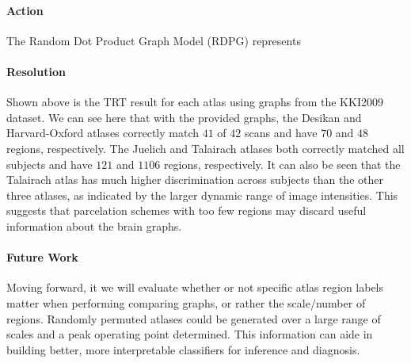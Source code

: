 \documentclass[12pt]{article}
\begin{document}
\paragraph{Action}
The Random Dot Product Graph Model (RDPG) represents
\paragraph{Resolution}
Shown above is the TRT result for each atlas using graphs from the KKI2009 dataset. We can see here that with the provided graphs, the Desikan and Harvard-Oxford atlases correctly match $41$ of $42$ scans and have $70$ and $48$ regions, respectively. The Juelich and Talairach atlases both correctly matched all subjects and have $121$ and $1106$ regions, respectively. It can also be seen that the Talairach atlas has much higher discrimination across subjects than the other three atlases, as indicated by the larger dynamic range of image intensities. This suggests that parcelation schemes with too few regions may discard useful information about the brain graphs.
\paragraph{Future Work}
Moving forward, it we will evaluate whether or not specific atlas region labels matter when performing comparing graphs, or rather the scale/number of regions. Randomly permuted atlases could be generated over a large range of scales and a peak operating point determined. This information can aide in building better, more interpretable classifiers for inference and diagnosis.

\newpage



\end{document}

